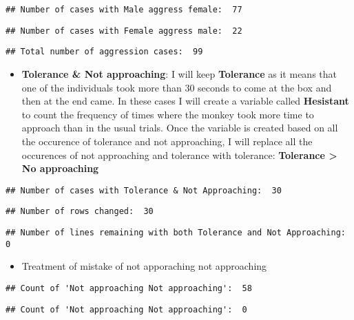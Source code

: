 \documentclass[
]{article}
\providecommand{\tightlist}{%
  \setlength{\itemsep}{0pt}\setlength{\parskip}{0pt}}
\begin{document}
\begin{verbatim}
## Number of cases with Male aggress female:  77
\end{verbatim}

\begin{verbatim}
## Number of cases with Female aggress male:  22
\end{verbatim}

\begin{verbatim}
## Total number of aggression cases:  99
\end{verbatim}

\begin{itemize}
\tightlist
\item
  \textbf{Tolerance \& Not approaching}: I will keep \textbf{Tolerance}
  as it means that one of the individuals took more than 30 seconds to
  come at the box and then at the end came. In these cases I will create
  a variable called \textbf{Hesistant} to count the frequency of times
  where the monkey took more time to approach than in the usual trials.
  Once the variable is created based on all the occurence of tolerance
  and not approaching, I will replace all the occurences of not
  approaching and tolerance with tolerance: \textbf{Tolerance
  \textgreater{} No approaching}
\end{itemize}

\begin{verbatim}
## Number of cases with Tolerance & Not Approaching:  30
\end{verbatim}

\begin{verbatim}
## Number of rows changed:  30
\end{verbatim}

\begin{verbatim}
## Number of lines remaining with both Tolerance and Not Approaching:  0
\end{verbatim}

\begin{itemize}
\tightlist
\item
  Treatment of mistake of not apporaching not approaching
\end{itemize}

\begin{verbatim}
## Count of 'Not approaching Not approaching':  58
\end{verbatim}

\begin{verbatim}
## Count of 'Not approaching Not approaching':  0
\end{verbatim}
\end{document}
